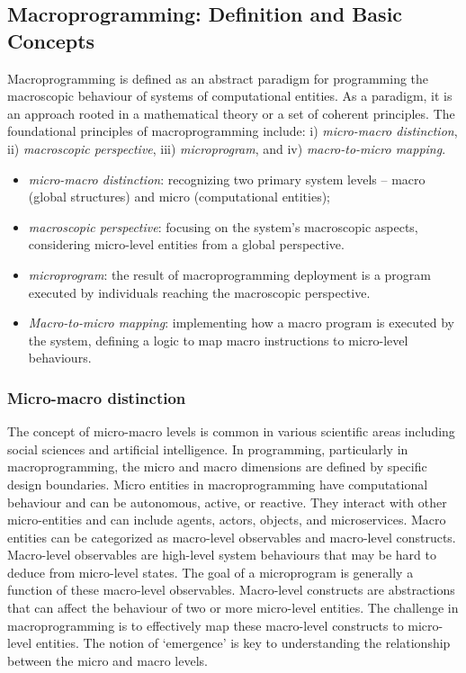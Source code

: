 \subsection{Macroprogramming: Definition and Basic Concepts}
\sloppy
Macroprogramming is defined as an abstract paradigm for programming the macroscopic behaviour of systems of computational entities. 
 As a paradigm, it is an approach rooted in a mathematical theory or a set of coherent principles. 
 The foundational principles of macroprogramming include: i) \emph{micro-macro distinction},
  ii) \emph{macroscopic perspective}, iii) \emph{microprogram}, and iv) \emph{macro-to-micro mapping}.
\begin{itemize}
    \item \emph{micro-macro distinction}: recognizing two primary system levels -- macro (global structures) and micro (computational entities);
    \item \emph{macroscopic perspective}: focusing on the system's macroscopic aspects, 
    considering micro-level entities from a global perspective.
    \item \emph{microprogram}: the result of macroprogramming deployment is a program executed by individuals reaching the macroscopic perspective.
    \item \emph{Macro-to-micro mapping}: implementing how a macro program is executed by the system, 
    defining a logic to map macro instructions to micro-level behaviours.
\end{itemize}

\subsubsection*{Micro-macro distinction}
The concept of micro-macro levels is common in various scientific areas including social sciences and artificial intelligence. 
 In programming, particularly in macroprogramming, 
 the micro and macro dimensions are defined by specific design boundaries. 
 Micro entities in macroprogramming have computational behaviour and can be autonomous, active, or reactive. 
 They interact with other micro-entities and can include agents, actors, objects, and microservices. 
 Macro entities can be categorized as macro-level observables and macro-level constructs. 
 Macro-level observables are high-level system behaviours that may be hard to deduce from micro-level states. 
 The goal of a microprogram is generally a function of these macro-level observables. 
 Macro-level constructs are abstractions that can affect the behaviour of two or more micro-level entities. 
 The challenge in macroprogramming is to effectively map these macro-level constructs to micro-level entities. 
 The notion of `emergence' is key to understanding the relationship between the micro and macro levels.

